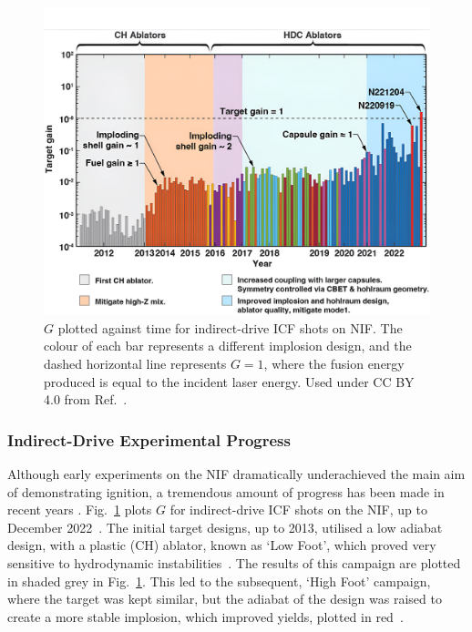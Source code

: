 \begin{figure}[t!]
    \includegraphics[width=\linewidth]{Introduction/Images/NIF_yields.jpg}
    \centering
    \caption{$G$ plotted against time for indirect-drive \ac{ICF} shots on \ac{NIF}.
    The colour of each bar represents a different implosion design, and the dashed horizontal line represents $G=1$, where the fusion energy produced is equal to the incident laser energy.
    Used under CC BY 4.0 from Ref.~\cite{abu-shawareb_achievement_2024}.
    }%
    \label{fig:intro_nif_yields}
\end{figure}

\subsubsection{Indirect-Drive Experimental Progress}%
\label{sec:intro_indirect_exp}

Although early experiments on the \ac{NIF} dramatically underachieved the main aim of demonstrating ignition, a tremendous amount of progress has been made in recent years \cite{hurricane_physics_2023}.
Fig.~\ref{fig:intro_nif_yields} plots $G$ for indirect-drive \ac{ICF} shots on the \ac{NIF}, up to December 2022~\cite{abu-shawareb_achievement_2024}.
The initial target designs, up to 2013, utilised a low adiabat design, with a plastic (CH) ablator, known as `Low Foot', which proved very sensitive to hydrodynamic instabilities~\cite{lindl_review_2014}.
The results of this campaign are plotted in shaded grey in Fig.~\ref{fig:intro_nif_yields}.
This led to the subsequent, `High Foot' campaign, where the target was kept similar, but the adiabat of the design was raised to create a more stable implosion, which improved yields, plotted in red~\cite{hurricane_highfoot_2014}.

